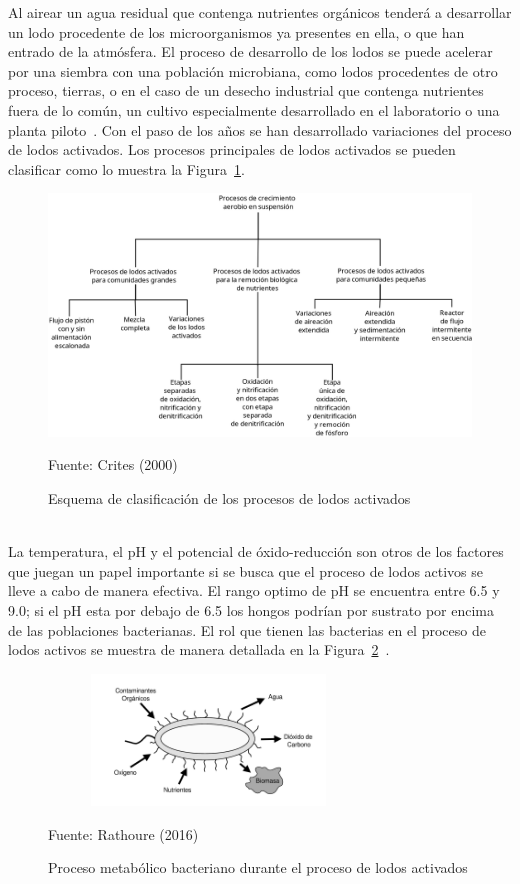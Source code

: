 Al airear un agua residual que contenga nutrientes orgánicos tenderá a desarrollar un lodo procedente de los microorganismos ya presentes en ella, o que han entrado de la atmósfera. El proceso de desarrollo de los lodos se puede acelerar por una siembra con una población microbiana, como lodos procedentes de otro proceso, tierras, o en el caso de un desecho industrial que contenga nutrientes fuera de lo común, un cultivo especialmente desarrollado en el laboratorio o una planta piloto~\emph{\citep{winkler96}}.
Con el paso de los años se han desarrollado variaciones del proceso de lodos activados. Los procesos principales de lodos activados se pueden clasificar como lo muestra la Figura~\ref{fig:procesosaer}.
	\begin{figure}[!h]
		\centering
		\includegraphics[scale=0.2]{Clasificacion_procesos_aer.png}
		\caption{Esquema de clasificación de los procesos de lodos activados}
		\small{Fuente: Crites (2000)}
		\label{fig:procesosaer}
	\end{figure}
\\La temperatura, el pH y el potencial de óxido-reducción son otros de los factores que juegan un papel importante si se busca que el proceso de lodos activos se lleve a cabo de manera efectiva. El rango optimo de pH se encuentra entre 6.5 y 9.0; si el pH esta por debajo de 6.5 los hongos podrían por sustrato por encima de las poblaciones bacterianas. El rol que tienen las bacterias en el proceso de lodos activos se muestra de manera detallada en la Figura~\ref{fig:rolbacteria}~\emph{\citep{ashok16, winkler96}}.
	\begin{figure}[h]
		\centering
		\includegraphics[height=3.5cm,width=8.5cm]{Bacteria_rol.png}
		\caption{Proceso metabólico bacteriano durante el proceso de lodos activados}
		\small{Fuente: Rathoure (2016)}
		\label{fig:rolbacteria}
	\end{figure}

